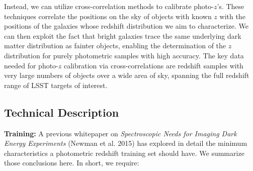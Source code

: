 Instead, we can utilize cross-correlation methods to calibrate photo-$z$'s.  These techniques correlate the positions on the sky of objects with known $z$ with the positions of the galaxies whose redshift distribution we aim to characterize.  We can then exploit the fact that bright galaxies trace the same underlying dark matter distribution as fainter objects, enabling the determination of the $z$ distribution for purely photometric samples with high accuracy.  The key data needed for photo-$z$ calibration via cross-correlations are redshift samples with very large numbers of objects over a wide area of sky, spanning the full redshift range of LSST targets of interest.




\subsection{Technical Description }



\label{sec:photoz_design}

{\bf Training:} A previous whitepaper on {\it Spectroscopic Needs for Imaging Dark Energy Experiments} (Newman et al. 2015) has explored in detail the minimum characteristics a photometric redshift training set should have.  We summarize those conclusions here.  In short, we require:

